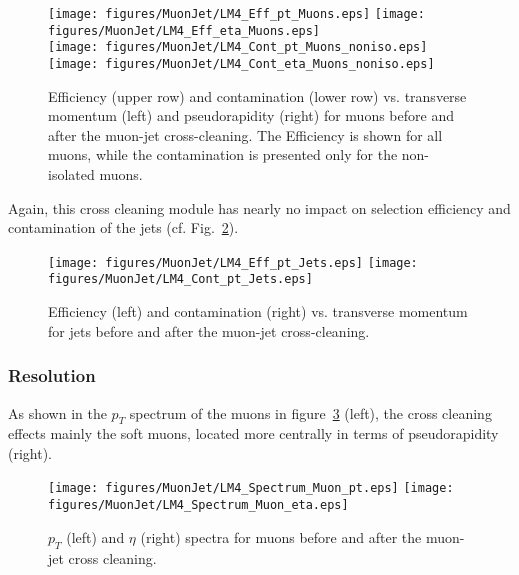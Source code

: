 \documentclass{cmspaper}
\begin{document}
\begin{figure}[hb]
\begin{center}
    \texttt{[image: figures/MuonJet/LM4\_Eff\_pt\_Muons.eps]}
    \texttt{[image: figures/MuonJet/LM4\_Eff\_eta\_Muons.eps]}\\
    \texttt{[image: figures/MuonJet/LM4\_Cont\_pt\_Muons\_noniso.eps]}
    \texttt{[image: figures/MuonJet/LM4\_Cont\_eta\_Muons\_noniso.eps]}
    \caption{Efficiency (upper row) and contamination (lower row) vs. transverse
    momentum (left) and pseudorapidity (right) for muons before and after the
    muon-jet cross-cleaning. The Efficiency is shown for all muons, while the contamination is presented only for the non-isolated muons.}
\label{fig:effCont_muon_MuonJet}
\end{center}
\end{figure}

Again, this cross cleaning module has nearly no impact on selection efficiency
and contamination of the jets (cf. Fig.~\ref{fig:effCont_Jets_MuonJet}).

\begin{figure}[hb]
\begin{center}
    \texttt{[image: figures/MuonJet/LM4\_Eff\_pt\_Jets.eps]}
    \texttt{[image: figures/MuonJet/LM4\_Cont\_pt\_Jets.eps]}
    \caption{Efficiency (left) and contamination (right) vs. transverse momentum
    for jets before and after the muon-jet cross-cleaning.}
\label{fig:effCont_Jets_MuonJet}
\end{center}
\end{figure}

\subsubsection{Resolution}
As shown in the \(p_T\) spectrum of the muons in
figure~\ref{fig:ObjSpectra_MuonJet} (left), the cross cleaning effects mainly
the soft muons, located more centrally in terms of pseudorapidity (right).

\begin{figure}[hb]
\begin{center}
    \texttt{[image: figures/MuonJet/LM4\_Spectrum\_Muon\_pt.eps]}
    \texttt{[image: figures/MuonJet/LM4\_Spectrum\_Muon\_eta.eps]}
    \caption{\(p_T\) (left) and \(\eta\) (right) spectra for muons before and
    after the muon-jet cross cleaning.}
\label{fig:ObjSpectra_MuonJet}
\end{center}
\end{figure} 
\end{document}
